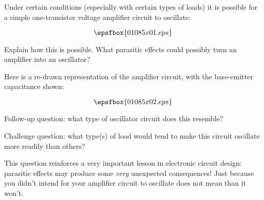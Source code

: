 

Under certain conditions (especially with certain types of loads) it is possible for a simple one-transistor voltage amplifier circuit to oscillate:

$$\epsfbox{01085x01.eps}$$

Explain how this is possible.  What parasitic effects could possibly turn an amplifier into an oscillator?







Here is a re-drawn representation of the amplifier circuit, with the base-emitter capacitance shown:

$$\epsfbox{01085x02.eps}$$

Follow-up question: what type of oscillator circuit does this resemble?

\vskip 10pt

Challenge question: what type(s) of load would tend to make this circuit oscillate more readily than others?







This question reinforces a very important lesson in electronic circuit design: parasitic effects may produce some {\it very} unexpected consequences!  Just because you didn't intend for your amplifier circuit to oscillate does not mean than it won't.



